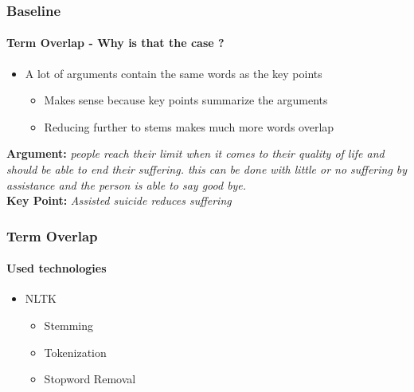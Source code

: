 \documentclass[english,handout]{mlutalk}
\begin{document}
\begin{frame}
  \frametitle{Baseline}
  \framesubtitle{Term Overlap - Why is that the case ?}
    
    \begin{itemize}
      \item A lot of arguments contain the same words as the key points
        \begin{itemize}
          \item Makes sense because key points summarize the arguments
          \item Reducing further to stems makes much more words overlap
        \end{itemize}
    \end{itemize}

    \begin{example}
      \textbf{Argument:} \textit{people reach their limit when it comes to their quality of life and should be able to end their suffering. this can be done with little or no suffering by assistance and the person is able to say good bye.}\\
      \textbf{Key Point:} \textit{Assisted suicide reduces suffering}
    \end{example}

\end{frame}

\begin{frame}
  \frametitle{Term Overlap}
  \framesubtitle{Used technologies}
    \begin{itemize}
      \item NLTK 
        \begin{itemize}
          \item Stemming
          \item Tokenization
          \item Stopword Removal
        \end{itemize}
    \end{itemize}
\end{frame}
\end{document}
